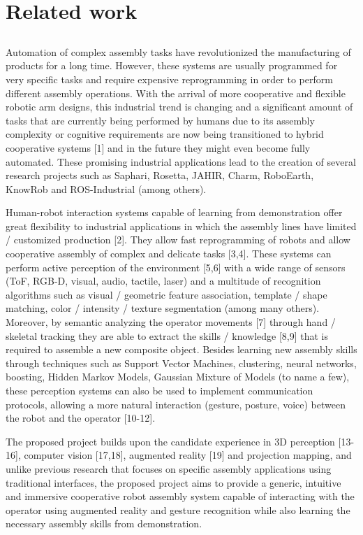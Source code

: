 \chapter{Related work}\label{chap:related-work}

\section*{}

Automation of complex assembly tasks have revolutionized the manufacturing of products for a long time. However, these systems are usually programmed for very specific tasks and require expensive reprogramming in order to perform different assembly operations. With the arrival of more cooperative and flexible robotic arm designs, this industrial trend is changing and a significant amount of tasks that are currently being performed by humans due to its assembly complexity or cognitive requirements are now being transitioned to hybrid cooperative systems [1] and in the future they might even become fully automated. These promising industrial applications lead to the creation of several research projects such as Saphari, Rosetta, JAHIR, Charm, RoboEarth, KnowRob and ROS-Industrial (among others).

Human-robot interaction systems capable of learning from demonstration offer great flexibility to industrial applications in which the assembly lines have limited / customized production [2]. They allow fast reprogramming of robots and allow cooperative assembly of complex and delicate tasks [3,4]. These systems can perform active perception of the environment [5,6] with a wide range of sensors (ToF, RGB-D, visual, audio, tactile, laser) and a multitude of recognition algorithms such as visual / geometric feature association, template / shape matching, color / intensity / texture segmentation (among many others). Moreover, by semantic analyzing the operator movements [7] through hand / skeletal tracking they are able to extract the skills / knowledge [8,9] that is required to assemble a new composite object. Besides learning new assembly skills through techniques such as Support Vector Machines, clustering, neural networks, boosting, Hidden Markov Models, Gaussian Mixture of Models (to name a few), these perception systems can also be used to implement communication protocols, allowing a more natural interaction (gesture, posture, voice) between the robot and the operator [10-12].

The proposed project builds upon the candidate experience in 3D perception [13-16], computer vision [17,18], augmented reality [19] and projection mapping, and unlike previous research that focuses on specific assembly applications using traditional interfaces, the proposed project aims to provide a generic, intuitive and immersive cooperative robot assembly system capable of interacting with the operator using augmented reality and gesture recognition while also learning the necessary assembly skills from demonstration.


